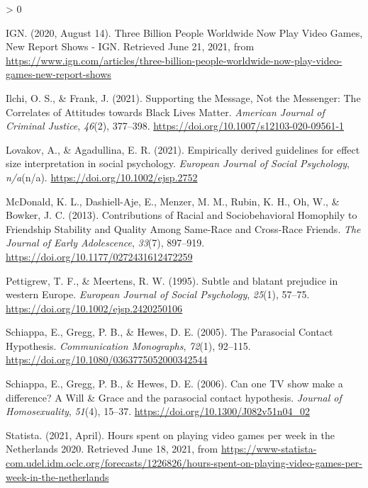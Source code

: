 \documentclass[
  english,
  man, noextraspace,floatsintext]{apa6}
\newlength{\cslhangindent}
\newenvironment{CSLReferences}[2] %
 {%
  \setlength{\parindent}{0pt}
  \ifodd #1 \everypar{\setlength{\hangindent}{\cslhangindent}}\ignorespaces\fi
  \ifnum #2 > 0
  \setlength{\parskip}{#2\baselineskip}
  \fi
 }%
 {}
\begin{document}
\begin{CSLReferences}{1}{0}
\leavevmode\hypertarget{ref-ignThreeBillionPeople2020}{}%
IGN. (2020, August 14). Three {Billion People Worldwide Now Play Video Games}, {New Report Shows} - {IGN}. Retrieved June 21, 2021, from \url{https://www.ign.com/articles/three-billion-people-worldwide-now-play-video-games-new-report-shows}

\leavevmode\hypertarget{ref-ilchiSupportingMessageNot2021}{}%
Ilchi, O. S., \& Frank, J. (2021). Supporting the {Message}, {Not} the {Messenger}: {The Correlates} of {Attitudes} towards {Black Lives Matter}. \emph{American Journal of Criminal Justice}, \emph{46}(2), 377--398. \url{https://doi.org/10.1007/s12103-020-09561-1}

\leavevmode\hypertarget{ref-lovakovEmpiricallyDerivedGuidelines2021}{}%
Lovakov, A., \& Agadullina, E. R. (2021). Empirically derived guidelines for effect size interpretation in social psychology. \emph{European Journal of Social Psychology}, \emph{n/a}(n/a). \url{https://doi.org/10.1002/ejsp.2752}

\leavevmode\hypertarget{ref-mcdonaldContributionsRacialSociobehavioral2013}{}%
McDonald, K. L., Dashiell-Aje, E., Menzer, M. M., Rubin, K. H., Oh, W., \& Bowker, J. C. (2013). Contributions of {Racial} and {Sociobehavioral Homophily} to {Friendship Stability} and {Quality Among Same}-{Race} and {Cross}-{Race Friends}. \emph{The Journal of Early Adolescence}, \emph{33}(7), 897--919. \url{https://doi.org/10.1177/0272431612472259}

\leavevmode\hypertarget{ref-pettigrewSubtleBlatantPrejudice1995}{}%
Pettigrew, T. F., \& Meertens, R. W. (1995). Subtle and blatant prejudice in western {Europe}. \emph{European Journal of Social Psychology}, \emph{25}(1), 57--75. \url{https://doi.org/10.1002/ejsp.2420250106}

\leavevmode\hypertarget{ref-schiappaParasocialContactHypothesis2005}{}%
Schiappa, E., Gregg, P. B., \& Hewes, D. E. (2005). The {Parasocial Contact Hypothesis}. \emph{Communication Monographs}, \emph{72}(1), 92--115. \url{https://doi.org/10.1080/0363775052000342544}

\leavevmode\hypertarget{ref-schiappaCanOneTV2006}{}%
Schiappa, E., Gregg, P. B., \& Hewes, D. E. (2006). Can one {TV} show make a difference? {A Will} \& {Grace} and the parasocial contact hypothesis. \emph{Journal of Homosexuality}, \emph{51}(4), 15--37. \url{https://doi.org/10.1300/J082v51n04_02}

\leavevmode\hypertarget{ref-statistaHoursSpentPlaying2021}{}%
Statista. (2021, April). Hours spent on playing video games per week in the {Netherlands} 2020. Retrieved June 18, 2021, from \url{https://www-statista-com.udel.idm.oclc.org/forecasts/1226826/hours-spent-on-playing-video-games-per-week-in-the-netherlands}


\end{CSLReferences}
\end{document}
